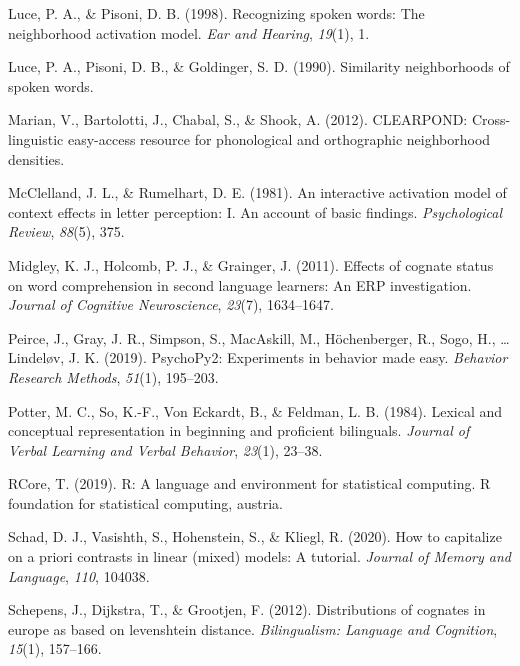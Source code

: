 \documentclass[
  english,
  man,floatsintext]{apa6}
\newlength{\cslhangindent}
\newenvironment{CSLReferences}[2] %
 {%
  \setlength{\parindent}{0pt}
  \ifodd #1 \everypar{\setlength{\hangindent}{\cslhangindent}}\ignorespaces\fi
  \ifnum #2 > 0
  \setlength{\parskip}{#2\baselineskip}
  \fi
 }%
 {}
\begin{document}
\begin{CSLReferences}{1}{0}
\leavevmode{}%
Luce, P. A., \& Pisoni, D. B. (1998). Recognizing spoken words: The neighborhood activation model. \emph{Ear and Hearing}, \emph{19}(1), 1.

\leavevmode{}%
Luce, P. A., Pisoni, D. B., \& Goldinger, S. D. (1990). Similarity neighborhoods of spoken words.

\leavevmode{}%
Marian, V., Bartolotti, J., Chabal, S., \& Shook, A. (2012). CLEARPOND: Cross-linguistic easy-access resource for phonological and orthographic neighborhood densities.

\leavevmode{}%
McClelland, J. L., \& Rumelhart, D. E. (1981). An interactive activation model of context effects in letter perception: I. An account of basic findings. \emph{Psychological Review}, \emph{88}(5), 375.

\leavevmode{}%
Midgley, K. J., Holcomb, P. J., \& Grainger, J. (2011). Effects of cognate status on word comprehension in second language learners: An ERP investigation. \emph{Journal of Cognitive Neuroscience}, \emph{23}(7), 1634--1647.

\leavevmode{}%
Peirce, J., Gray, J. R., Simpson, S., MacAskill, M., Höchenberger, R., Sogo, H., \ldots{} Lindeløv, J. K. (2019). PsychoPy2: Experiments in behavior made easy. \emph{Behavior Research Methods}, \emph{51}(1), 195--203.

\leavevmode{}%
Potter, M. C., So, K.-F., Von Eckardt, B., \& Feldman, L. B. (1984). Lexical and conceptual representation in beginning and proficient bilinguals. \emph{Journal of Verbal Learning and Verbal Behavior}, \emph{23}(1), 23--38.

\leavevmode{}%
RCore, T. (2019). R: A language and environment for statistical computing. R foundation for statistical computing, austria.

\leavevmode{}%
Schad, D. J., Vasishth, S., Hohenstein, S., \& Kliegl, R. (2020). How to capitalize on a priori contrasts in linear (mixed) models: A tutorial. \emph{Journal of Memory and Language}, \emph{110}, 104038.

\leavevmode{}%
Schepens, J., Dijkstra, T., \& Grootjen, F. (2012). Distributions of cognates in europe as based on levenshtein distance. \emph{Bilingualism: Language and Cognition}, \emph{15}(1), 157--166.


\end{CSLReferences}
\end{document}
